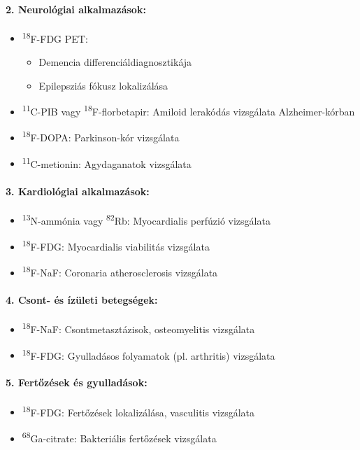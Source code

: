\documentclass[a4paper,12pt]{article}
\begin{document}
\paragraph{2. Neurológiai alkalmazások:} \begin{itemize} \item \textsuperscript{18}F-FDG PET: \begin{itemize} \item Demencia differenciáldiagnosztikája \item Epilepsziás fókusz lokalizálása \end{itemize} \item \textsuperscript{11}C-PIB vagy \textsuperscript{18}F-florbetapir: Amiloid lerakódás vizsgálata Alzheimer-kórban \item \textsuperscript{18}F-DOPA: Parkinson-kór vizsgálata \item \textsuperscript{11}C-metionin: Agydaganatok vizsgálata \end{itemize}

\paragraph{3. Kardiológiai alkalmazások:} \begin{itemize} \item \textsuperscript{13}N-ammónia vagy \textsuperscript{82}Rb: Myocardialis perfúzió vizsgálata \item \textsuperscript{18}F-FDG: Myocardialis viabilitás vizsgálata \item \textsuperscript{18}F-NaF: Coronaria atherosclerosis vizsgálata \end{itemize}

\paragraph{4. Csont- és ízületi betegségek:} \begin{itemize} \item \textsuperscript{18}F-NaF: Csontmetasztázisok, osteomyelitis vizsgálata \item \textsuperscript{18}F-FDG: Gyulladásos folyamatok (pl. arthritis) vizsgálata \end{itemize}

\paragraph{5. Fertőzések és gyulladások:} \begin{itemize} \item \textsuperscript{18}F-FDG: Fertőzések lokalizálása, vasculitis vizsgálata \item \textsuperscript{68}Ga-citrate: Bakteriális fertőzések vizsgálata \end{itemize}
\end{document}
